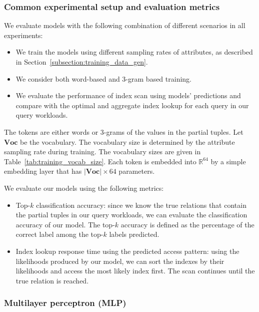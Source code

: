 \subsubsection{Common experimental setup and evaluation metrics}
 We evaluate models with the following combination of different scenarios in all experiments:
\begin{itemize}
	\item We train the models using different sampling rates of attributes, as described in Section~\ref{subsection:training_data_gen}.
	\item We consider both word-based and 3-gram based training.
	\item We evaluate the performance of index scan using models' predictions
	and compare with the optimal and aggregate index lookup for each query in our query workloads.
\end{itemize}

The tokens are either words or 3-grams of the values in the partial tuples.  Let $\mathbf{Voc}$ be the vocabulary.  The vocabulary size is determined by the attribute sampling rate during training. The vocabulary sizes are given in Table~\ref{tab:training_vocab_size}. Each token is embedded into $\mathbb{R}^{64}$ by a simple embedding layer that has
$|\mathbf{Voc}|\times 64$ parameters.

We evaluate our models using the following metrics:
\begin{itemize}
\item Top-$k$ classification accuracy: since we know the true relations that contain the partial tuples in our query workloads, we can evaluate the classification accuracy of our model.  The top-$k$ accuracy is defined as the percentage of the correct label among the top-$k$ labels predicted.
\item Index lookup response time using the predicted access pattern: using the likelihoods produced by our model, we can sort the indexes by their likelihoods and access the most likely index first. The scan continues until the true relation is reached.
\end{itemize}

\subsubsection{Multilayer perceptron (MLP)}
\label{subsection:expt_mlp}

